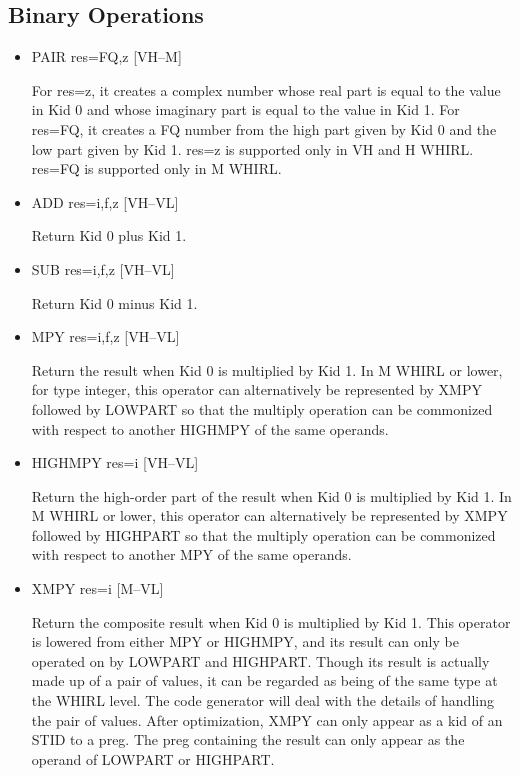\subsection{Binary Operations}
\begin{itemize}

%
\item  PAIR res=FQ,z \hfill [VH--M]

For res=z, it creates a complex number whose real part is equal to
the value in Kid 0 and whose imaginary part is equal to the value
in Kid 1. For res=FQ, it creates a FQ number from the high part given by Kid
0 and the low part given by Kid 1. res=z is supported only in VH
and H WHIRL. res=FQ is supported only in M WHIRL. 

\item
{}%
ADD res=i,f,z \hfill [VH--VL]

Return Kid 0 plus Kid 1.


\item
{}%
SUB res=i,f,z \hfill [VH--VL]

Return Kid 0 minus Kid 1.

\item
{}%
MPY res=i,f,z \hfill [VH--VL]

Return the result when Kid 0 is multiplied by Kid 1. In M WHIRL
or lower, for type integer, this operator can alternatively be
represented by
%
XMPY followed by
%
LOWPART so that the multiply operation can be
commonized with respect to another
%
HIGHMPY of the same operands.

\item
{}%
HIGHMPY res=i \hfill [VH--VL]

Return the high-order part of the result when Kid 0 is multiplied
by Kid 1. In M WHIRL or lower, this operator can alternatively be
represented
by
%
XMPY followed by
%
HIGHPART so that the multiply operation can
be commonized with respect to another
%
MPY of the same operands.

\item
{}%
XMPY res=i \hfill [M--VL]

Return the composite result when Kid 0 is multiplied by Kid 1. This
operator is lowered from either
%
MPY or
%
HIGHMPY, and its result can only be operated on by
%
LOWPART
and
%
HIGHPART. Though its result is actually made up of a pair of
values, it can be regarded as being of the same type
at the WHIRL level. The code generator will deal with the details
of handling the pair of values. After optimization,
%
XMPY can only appear as a kid of an
%
STID to a preg. The preg containing
the result can only appear as the operand of
%
LOWPART or
%
HIGHPART.


\end{itemize}
